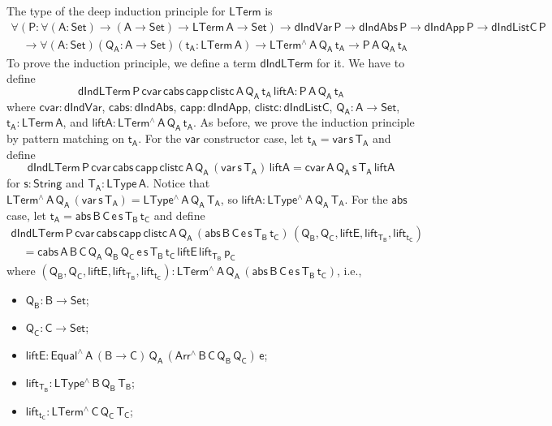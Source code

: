 \documentclass[9pt]{entcs}
\begin{document}
The type of the deep induction principle for $\mathsf{LTerm}$ is
\[
\begin{array}{l}
\mathsf{\forall (P : \forall (A : Set) \to (A \to Set) \to LTerm\,A \to Set)
  \to dIndVar\,P \to dIndAbs\,P \to dIndApp\,P \to dIndListC\,P} \\
\quad \mathsf{\to \forall (A : Set)(Q_A : A \to Set)(t_A : LTerm\,A) \to LTerm^{\wedge}\,A\,Q_A\,t_A \to P\,A\,Q_A\,t_A}
\end{array}
\]
To prove the induction principle, we define a term $\mathsf{dIndLTerm}$ for it.
We have to define 
\[ 
\mathsf{dIndLTerm \, P\, cvar \, cabs\, capp\, clistc \, A\, Q_A\, t_A\, liftA : P\, A\, Q_A\, t_A}
\]
where $\mathsf{cvar: dIndVar}$, $\mathsf{cabs: dIndAbs}$, $\mathsf{capp : dIndApp}$, $\mathsf{clistc : dIndListC}$,
$\mathsf{Q_A : A \to Set}$, $\mathsf{t_A : LTerm\,A}$, and $\mathsf{liftA : LTerm^{\wedge}\,A\,Q_A\,t_A}$.
As before, we prove the induction principle by pattern matching on $\mathsf{t_A}$. 
For the $\mathsf{var}$ constructor case, let $\mathsf{t_A = var\, s\, T_A}$ and define
\[
  \mathsf{dIndLTerm \, P\, cvar \, cabs\, capp\, clistc \, A\, Q_A\, (var\,s\,T_A) \, liftA = cvar \, A\, Q_A\, s\, T_A\, liftA }
\]
for $\mathsf{s : String}$ and $\mathsf{T_A : LType\,A}$.
Notice that $\mathsf{LTerm^{\wedge}\, A\, Q_A\, (var\,s\,T_A) = LType^{\wedge}\,A\,Q_A\,T_A}$, so 
$\mathsf{liftA : LType^{\wedge}\,A\,Q_A\,T_A}$.
%
For the $\mathsf{abs}$ case, let $\mathsf{t_A = abs \,B \,C \, e \,s \,T_B \, t_C} $ and define
\[
\begin{array}{l}
\mathsf{dIndLTerm \, P\, cvar \, cabs\, capp\, clistc \, A\, Q_A\, (abs \,B \,C \,e \,s \,T_B \, t_C) \, (Q_B , Q_C , liftE, lift_{T_B}, lift_{t_C})} \\
\quad \mathsf{= cabs\,A\,B\,C\, Q_A\, Q_B\, Q_C\, e\, s\, T_B\, t_C\, liftE\, lift_{T_B}\, p_C}
\end{array}
\]
where $\mathsf{(Q_B , Q_C , liftE, lift_{T_B}, lift_{t_C}) : LTerm^{\wedge}\, A\, Q_A\, (abs \,B \,C \, e \,s \,T_B \, t_C)}$, i.e.,
\begin{itemize}
  \item $\mathsf{Q_B : B \to Set}$;
  \item $\mathsf{Q_C : C \to Set}$;
  \item $\mathsf{liftE : Equal^{\wedge} \, A\, (B \to C)\, Q_A\, (Arr^{\wedge} \, B\, C\, Q_B \, Q_C) \, e}$;
  \item $\mathsf{lift_{T_B}: LType^{\wedge} \, B\, Q_B\, T_B}$;
  \item $\mathsf{lift_{t_C}: LTerm^{\wedge} \, C\, Q_C\, T_C}$;
\end{itemize}
\end{document}
